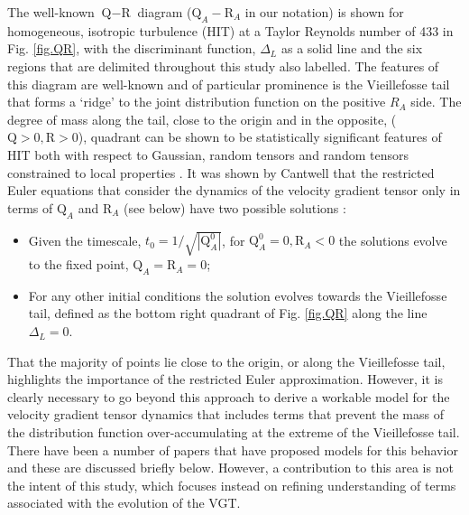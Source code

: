\documentclass[preprint,amssymb,amsmath,aip,cha]{revtex4-1}
\begin{document}
The well-known $\mbox{Q}-\mbox{R}$ diagram ($\mbox{Q}_{A}-\mbox{R}_{A}$ in our notation) is shown for homogeneous, isotropic turbulence (HIT) at a Taylor Reynolds number of 433 in Fig. \ref{fig.QR}, with the discriminant function, $\Delta_{L}$ as a solid line and the six regions that are delimited throughout this study also labelled. The features of this diagram are well-known and of particular prominence is the Vieillefosse tail \citep{vieillefosse84} that forms a `ridge' to the joint distribution function on the positive $R_{A}$ side. The degree of mass along the tail, close to the origin and in the opposite, ($\mbox{Q} > 0, \mbox{R} > 0$), quadrant can be shown to be statistically significant features of HIT both with respect to Gaussian, random tensors \citep{tsinober01} and random tensors constrained to local properties \citep{k17}. It was shown by Cantwell that the restricted Euler equations that consider the dynamics of the velocity gradient tensor only in terms of $\mbox{Q}_{A}$ and $\mbox{R}_{A}$ (see below) have two possible solutions \citep{cantwell92}:
\begin{itemize}
\item Given the timescale, $t_{0} = 1 / \sqrt{|\mbox{Q}_{A}^{0}|}$, for $\mbox{Q}_{A}^{0} = 0, \mbox{R}_{A} < 0$ the solutions evolve to the fixed point, $\mbox{Q}_{A} = \mbox{R}_{A} = 0$;
\item For any other initial conditions the solution evolves towards the Vieillefosse tail, defined as the bottom right quadrant of Fig. \ref{fig.QR} along the line $\Delta_{L} = 0$. 
\end{itemize}
That the majority of points lie close to the origin, or along the Vieillefosse tail, highlights the importance of the restricted Euler approximation. However, it is clearly necessary to go beyond this approach to derive a workable model for the velocity gradient tensor dynamics that includes terms that prevent the mass of the distribution function over-accumulating at the extreme of the Vieillefosse tail. There have been a number of papers that have proposed models for this behavior and these are discussed briefly below. However, a contribution to this area is not the intent of this study, which focuses instead on refining understanding of terms associated with the evolution of the VGT.
\end{document}
